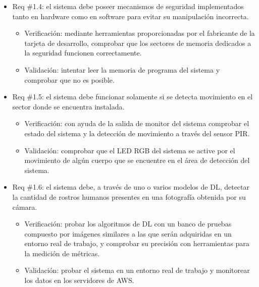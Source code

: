 \documentclass[
11pt, %
]{plan}
\begin{document}
\begin{enumerate}
\begin{itemize}
		\end{itemize}
		
		\begin{itemize}
			\item Req \#1.4: el sistema debe poseer mecanismos de seguridad implementados tanto en hardware como en software para evitar su manipulación incorrecta.

			\begin{itemize}
				\item Verificación: mediante herramientas proporcionadas por el fabricante de la tarjeta de desarrollo, comprobar que los sectores de memoria dedicados a la seguridad funcionen correctamente.
				\item Validación: intentar leer la memoria de programa del sistema y comprobar que no es posible.
			\end{itemize}

		\end{itemize}
		
		\begin{itemize}
			\item Req \#1.5: el sistema debe funcionar solamente si se detecta movimiento en el sector donde se encuentra instalada.

			\begin{itemize}
				\item Verificación: con ayuda de la salida de monitor del sistema comprobar el estado del sistema y la detección de movimiento a través del sensor PIR.
				\item Validación: comprobar que el LED RGB del sistema se active por el movimiento de algún cuerpo que se encuentre en el área de detección del sistema.
			\end{itemize}

		\end{itemize}
				
		\begin{itemize}
			\item Req \#1.6: el sistema debe, a través de uno o varios modelos de DL, detectar la cantidad de rostros humanos presentes en una fotografía obtenida por su cámara.

			\begin{itemize}
				\item Verificación: probar los algoritmos de DL con un banco de pruebas compuesto por imágenes similares a las que serán adquiridas en un entorno real de trabajo, y comprobar su precisión con herramientas para la medición de métricas.
				\item Validación: probar el sistema en un entorno real de trabajo y monitorear los datos en los servidores de AWS.
			\end{itemize}


\end{itemize}
\end{enumerate}
\end{document}

